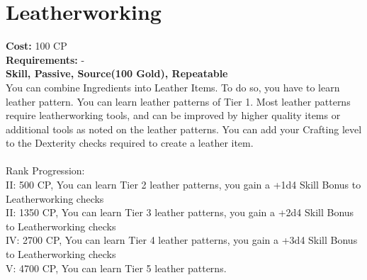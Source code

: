 \section{Leatherworking}\label{perk:leatherworking}
\textbf{Cost:} 100 CP\\
\textbf{Requirements:} -\\
\textbf{Skill, Passive, Source(100 Gold), Repeatable}\\
You can combine Ingredients into Leather Items.
To do so, you have to learn leather pattern.
You can learn leather patterns of Tier 1.
Most leather patterns require leatherworking tools, and can be improved by higher quality items or additional tools as noted on the leather patterns.
You can add your Crafting level to the Dexterity checks required to create a leather item.\\
\\
Rank Progression:\\
II: 500 CP, You can learn Tier 2 leather patterns, you gain a +1d4 Skill Bonus to Leatherworking checks\\
II: 1350 CP, You can learn Tier 3 leather patterns, you gain a +2d4 Skill Bonus to Leatherworking checks\\
IV: 2700 CP, You can learn Tier 4 leather patterns, you gain a +3d4 Skill Bonus to Leatherworking checks\\
V: 4700 CP, You can learn Tier 5 leather patterns.\\